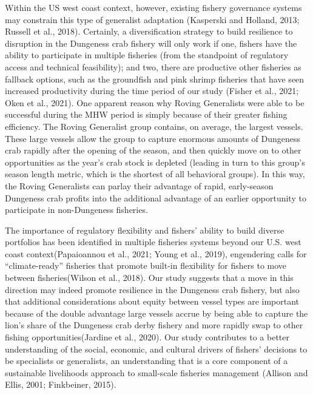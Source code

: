 \documentclass[]{elsarticle} %
\begin{document}
Within the US west coast context, however, existing fishery governance
systems may constrain this type of generalist adaptation (Kasperski and
Holland, 2013; Russell et al., 2018). Certainly, a diversification
strategy to build resilience to disruption in the Dungeness crab fishery
will only work if one, fishers have the ability to participate in
multiple fisheries (from the standpoint of regulatory access and
technical feasibility); and two, there are productive other fisheries as
fallback options, such as the groundfish and pink shrimp fisheries that
have seen increased productivity during the time period of our study
(Fisher et al., 2021; Oken et al., 2021). One apparent reason why Roving
Generalists were able to be successful during the MHW period is simply
because of their greater fishing efficiency. The Roving Generalist group
contains, on average, the largest vessels. These large vessels allow the
group to capture enormous amounts of Dungeness crab rapidly after the
opening of the season, and then quickly move on to other opportunities
as the year's crab stock is depleted (leading in turn to this group's
season length metric, which is the shortest of all behavioral groups).
In this way, the Roving Generalists can parlay their advantage of rapid,
early-season Dungeness crab profits into the additional advantage of an
earlier opportunity to participate in non-Dungeness fisheries.

The importance of regulatory flexibility and fishers' ability to build
diverse portfolios has been identified in multiple fisheries systems
beyond our U.S. west coast context(Papaioannou et al., 2021; Young et
al., 2019), engendering calls for ``climate-ready'' fisheries that
promote built-in flexibility for fishers to move between
fisheries(Wilson et al., 2018). Our study suggests that a move in this
direction may indeed promote resilience in the Dungeness crab fishery,
but also that additional considerations about equity between vessel
types are important because of the double advantage large vessels accrue
by being able to capture the lion's share of the Dungeness crab derby
fishery and more rapidly swap to other fishing opportunities(Jardine et
al., 2020). Our study contributes to a better understanding of the
social, economic, and cultural drivers of fishers' decisions to be
specialists or generalists, an understanding that is a core component of
a sustainable livelihoods approach to small-scale fisheries management
(Allison and Ellis, 2001; Finkbeiner, 2015).
\end{document}
